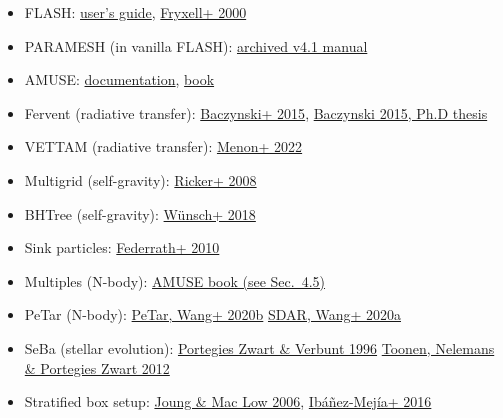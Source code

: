 \documentclass[10pt]{article}
\begin{document}
\begin{itemize}
    \item FLASH:
        \href{http://flash.uchicago.edu/site/flashcode/user_support/}{user's guide},
        \href{http://adsabs.harvard.edu/abs/2000ApJS..131..273F}{Fryxell+ 2000}
    \item PARAMESH (in vanilla FLASH):
        \href{https://web.archive.org/web/20160421055017/http://www.physics.drexel.edu/~olson/paramesh-doc/Users_manual/amr.html}{archived v4.1 manual}
    \item AMUSE:
        \href{http://www.amusecode.org/}{documentation},
        \href{https://iopscience.iop.org/book/978-0-7503-1320-9}{book}
    \item Fervent (radiative transfer):
        \href{https://ui.adsabs.harvard.edu/abs/2015MNRAS.454..380B/abstract}{Baczynski+ 2015},
        \href{http://archiv.ub.uni-heidelberg.de/volltextserver/19189/}{Baczynski 2015, Ph.D thesis}
    \item VETTAM (radiative transfer):
        \href{https://ui.adsabs.harvard.edu/abs/2022MNRAS.512..401M/abstract}{Menon+ 2022}
    \item Multigrid (self-gravity):
        \href{https://ui.adsabs.harvard.edu/abs/2008ApJS..176..293R/abstract}{Ricker+ 2008}
    \item BHTree (self-gravity):
        \href{https://ui.adsabs.harvard.edu/abs/2018MNRAS.475.3393W/abstract}{W\"{u}nsch+ 2018}
    \item Sink particles:
        \href{https://ui.adsabs.harvard.edu/abs/2010ApJ...713..269F/abstract}{Federrath+ 2010}
    \item Multiples (N-body):
        \href{https://iopscience.iop.org/book/978-0-7503-1320-9}{AMUSE book (see Sec.~4.5)}
    \item PeTar (N-body):
        \href{https://ui.adsabs.harvard.edu/abs/2020MNRAS.497..536W/abstract}{PeTar, Wang+ 2020b}
        \href{https://ui.adsabs.harvard.edu/abs/2020MNRAS.493.3398W/abstract}{SDAR, Wang+ 2020a}
    \item SeBa (stellar evolution):
        \href{https://ui.adsabs.harvard.edu/abs/1996A&A...309..179P/abstract}{Portegies Zwart \& Verbunt 1996}
        \href{https://ui.adsabs.harvard.edu/abs/2012A&A...546A..70T/abstract}{Toonen, Nelemans \& Portegies Zwart 2012}
    \item Stratified box setup:
        \href{https://ui.adsabs.harvard.edu/abs/2006ApJ...653.1266J/abstract}{Joung \& Mac Low 2006},
        \href{https://ui.adsabs.harvard.edu/abs/2016ApJ...824...41I/abstract}{Ib\'{a}\~{n}ez-Mej\'{i}a+ 2016}
\end{itemize}
\end{document}
